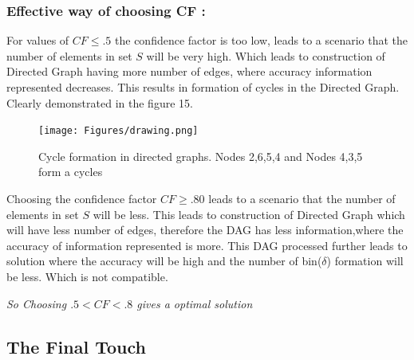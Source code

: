\documentclass{article}
\begin{document}
\subsubsection{Effective way of choosing CF :}
For values of $CF \leq .5$ the confidence factor is too low, leads to a scenario that the number of elements in set $S$ will be very high. Which leads to construction of Directed Graph having more number of edges, where accuracy information represented decreases. This results in formation of cycles in the Directed Graph. Clearly demonstrated in the figure 15.
\begin{figure}[htp]
\centering
\texttt{[image: Figures/drawing.png]}
\caption{Cycle formation in directed graphs. Nodes 2,6,5,4 and Nodes 4,3,5 form a cycles }
\label{}
\end{figure}

Choosing the confidence factor $CF \geq .80$ leads to a scenario that the number of elements in set $S$ will be less. This leads to construction of Directed Graph which will have less number of edges, therefore the DAG has less information,where the accuracy of information represented is more. This DAG processed further leads to solution where the accuracy will be high and the number of bin($\delta$) formation will be less. Which is not compatible.  

\emph{So Choosing $.5<CF<.8$ gives a optimal solution}

\subsection{The Final Touch}
\end{document}
